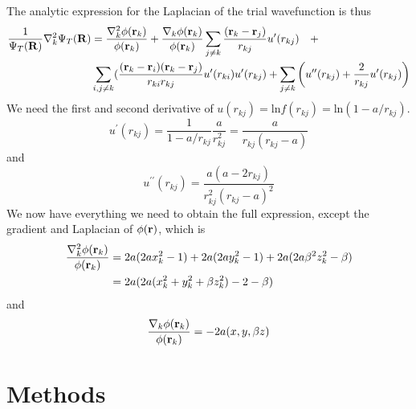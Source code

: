 \documentclass[english, a4paper]{article}
\begin{document}
The analytic expression for the Laplacian of the trial wavefunction is thus
\begin{align}
 \frac{1}{\Psi_T({\bf R})}\nabla^2_k\Psi_T({\bf R}) &= 
 \frac{\nabla^2_k\phi({\bf r}_k)}{\phi({\bf r}_k)} + \frac{\nabla_k\phi({\bf r}_k)}{\phi({\bf r}_k)} 
 \sum_{j\neq k}\frac{({\bf r}_k - {\bf r}_j)}{r_{kj}} u^\prime(r_{kj}) \quad + \\
 &\sum_{i,j\neq k} (\frac{({\bf r}_k - {\bf r}_i)({\bf r}_k - {\bf r}_j)}{r_{ki}r_{kj}} u^\prime(r_{ki})u^\prime(r_{kj})
 + \sum_{j\neq k}\left( u^{\prime\prime}(r_{kj}) + \frac{2}{r_{kj}} u^\prime(r_{kj}) \right)
 \label{analytickin}
\end{align}
We need the first and second derivative of $u(r_{kj}) = \textrm{ln} f(r_{kj}) = \textrm{ln} (1-a/r_{kj})$.
\begin{equation}
 u^\prime(r_{kj}) = \frac{1}{1-a/r_{kj}} 
 \frac{a}{r^2_{kj}} = \frac{a}{r_{kj}(r_{kj} - a)}
\end{equation}
and
\begin{equation}
 u^{\prime\prime}(r_{kj}) = \frac{a(a - 2r_{kj})}{r_{kj}^2 ( r_{kj} - a)^2}
\end{equation}
We now have everything we need to obtain the full expression, except the gradient and Laplacian of
$\phi({\bf r})$, which is
\begin{align}
 \frac{\nabla^2_k\phi({\bf r}_k)}{\phi({\bf r}_k)} &= 2a(2ax_k^2 - 1) + 2a(2ay_k^2 - 1) + 2a(2a\beta^2z_k^2 - \beta) \\
 &= 2a(2a(x_k^2 + y_k^2 + \beta z_k^2) - 2 - \beta)
\end{align}
and
\begin{equation}
 \frac{\nabla_k\phi({\bf r}_k)}{\phi({\bf r}_k)}  = 
 -2a(x, y, \beta z)
\end{equation}




















\section{Methods}
\end{document}
